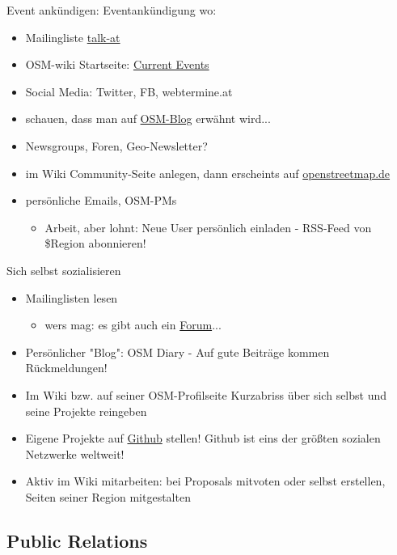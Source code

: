 \documentclass{beamer}
\begin{document}
\begin{frame}{Event ankündigen:}
	Eventankündigung wo:
	\begin{itemize}
		\item Mailingliste \href{http://lists.openstreetmap.org/listinfo/talk-at}{talk-at}
		\item OSM-wiki Startseite: \href{http://wiki.openstreetmap.org/wiki/Current\_events}{Current Events}
		\item Social Media: Twitter, FB, webtermine.at
		\item schauen, dass man auf \href{http://blog.openstreetmap.de/}{OSM-Blog} erwähnt wird...
		\item Newsgroups, Foren, Geo-Newsletter?
		\item im Wiki Community-Seite anlegen, dann erscheints auf \href{http://openstreetmap.de}{openstreetmap.de}
		\item persönliche Emails, OSM-PMs
		\begin{itemize}
			\item  Arbeit, aber lohnt: Neue User persönlich einladen - RSS-Feed von \$Region abonnieren!
		\end{itemize}
	\end{itemize}
\end{frame}

\begin{frame}{Sich selbst sozialisieren}
	
	\begin{itemize}
		\item Mailinglisten lesen
		\begin{itemize}
			\item wers mag: es gibt auch ein \href{http://forum.openstreetmap.org/viewforum.php?id=14}{Forum}...
		\end{itemize}
		\item Persönlicher "Blog": OSM Diary - Auf gute Beiträge kommen Rückmeldungen!
		\item Im Wiki bzw. auf seiner OSM-Profilseite Kurzabriss über sich selbst und seine Projekte reingeben
		\item Eigene Projekte auf \href{http://github.com}{Github} stellen! Github ist eins der größten sozialen Netzwerke weltweit!
		\item Aktiv im Wiki mitarbeiten: bei Proposals mitvoten oder selbst erstellen, Seiten seiner Region mitgestalten
	\end{itemize}
\end{frame}

\subsection{Public Relations}
\end{document}

